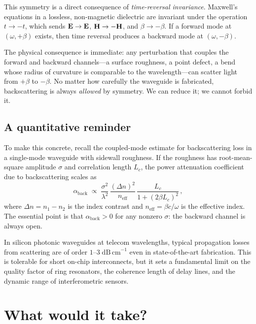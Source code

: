 This symmetry is a direct consequence of \emph{time-reversal
invariance}.  Maxwell's equations in a lossless, non-magnetic dielectric
are invariant under the operation $t\to -t$, which sends
$\mathbf{E}\to\mathbf{E}$, $\mathbf{H}\to-\mathbf{H}$, and
$\beta\to-\beta$.  If a forward mode at $(\omega,+\beta)$ exists, then
time reversal produces a backward mode at $(\omega,-\beta)$.

The physical consequence is immediate: any perturbation that couples the
forward and backward channels---a surface roughness, a point defect, a
bend whose radius of curvature is comparable to the wavelength---can
scatter light from $+\beta$ to $-\beta$.  No matter how carefully
the waveguide is fabricated, backscattering is always \emph{allowed} by
symmetry.  We can reduce it; we cannot forbid it.

\subsection{A quantitative reminder}
\label{sec:ch1-backscattering-quantitative}

To make this concrete, recall the coupled-mode estimate for
backscattering loss in a single-mode waveguide with sidewall roughness.
If the roughness has root-mean-square amplitude $\sigma$ and correlation
length $L_c$, the power attenuation coefficient due to backscattering
scales as
\begin{equation}\label{eq:ch1-roughness-loss}
  \alpha_{\mathrm{back}} \;\propto\;
  \frac{\sigma^2}{\lambda^2}\,
  \frac{(\Delta n)^2}{n_{\mathrm{eff}}}\,
  \frac{L_c}{1 + (2\beta L_c)^2}\,,
\end{equation}
where $\Delta n = n_1-n_2$ is the index contrast and
$n_{\mathrm{eff}}=\beta c/\omega$ is the effective index.
The essential point is that $\alpha_{\mathrm{back}}>0$ for any nonzero
$\sigma$: the backward channel is always open.

In silicon photonic waveguides at telecom wavelengths, typical
propagation losses from scattering are of order
$1$--$3\;\mathrm{dB\,cm}^{-1}$ even in state-of-the-art fabrication.
This is tolerable for short on-chip interconnects, but it sets a
fundamental limit on the quality factor of ring resonators, the
coherence length of delay lines, and the dynamic range of interferometric
sensors.

\section{What would it take?}
\label{sec:ch1-what-would-it-take}

